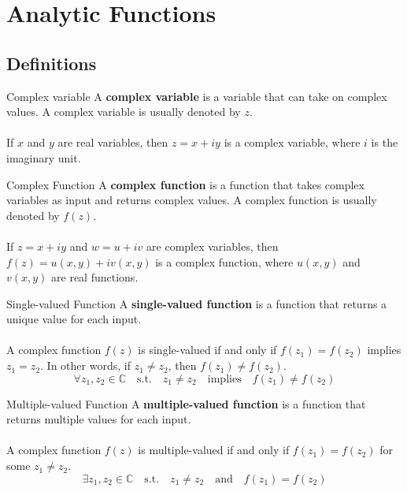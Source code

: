 
\section{Analytic Functions}
\subsection{Definitions}

\begin{definition}{Complex variable}{}
    A \textbf{complex variable} is a variable that can take on complex values. A complex variable is usually denoted by $z$. \\~\\
    
    If $x$ and $y$ are real variables, then $z = x + iy$ is a complex variable, where $i$ is the imaginary unit.
\end{definition}

\begin{definition}{Complex Function}{}
    A \textbf{complex function} is a function that takes complex variables as input and returns complex values. A complex function is usually denoted by $f(z)$. \\~\\

    If $z = x + iy$ and $w = u + iv$ are complex variables, then $f(z) = u(x, y) + iv(x, y)$ is a complex function, where $u(x, y)$ and $v(x, y)$ are real functions.
\end{definition}

\begin{definition}{Single-valued Function}{}
    A \textbf{single-valued function} is a function that returns a unique value for each input. \\~\\
    
    A complex function $f(z)$ is single-valued if and only if $f(z_1) = f(z_2)$ implies $z_1 = z_2$. In other words, if $z_1 \neq z_2$, then $f(z_1) \neq f(z_2)$.
    \[
        \forall z_1, z_2 \in \mathbb{C} \quad \text{s.t.} \quad z_1 \neq z_2 \quad \text{implies} \quad f(z_1) \neq f(z_2)
    \] 
\end{definition}

\begin{definition}{Multiple-valued Function}{}
    A \textbf{multiple-valued function} is a function that returns multiple values for each input. \\~\\
    
    A complex function $f(z)$ is multiple-valued if and only if $f(z_1) = f(z_2)$ for some $z_1 \neq z_2$.
    \[
        \exists z_1, z_2 \in \mathbb{C} \quad \text{s.t.} \quad z_1 \neq z_2 \quad \text{and} \quad f(z_1) = f(z_2)
    \] 
\end{definition}

